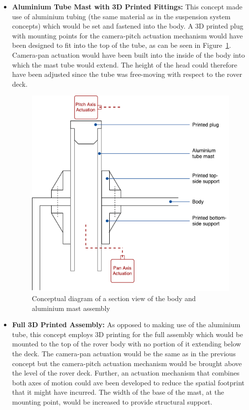       \begin{itemize}
        \item \textbf{Aluminium Tube Mast with 3D Printed Fittings:} This concept made use of aluminium tubing (the same material as in the suspension system concepts) which would be set and fastened into the body. A 3D printed plug with mounting points for the camera-pitch actuation mechanism would have been designed to fit into the top of the tube, as can be seen in Figure~\ref{fig:concepts-aluMast}. Camera-pan actuation would have been built into the inside of the body into which the mast tube would extend. The height of the head could therefore have been adjusted since the tube was free-moving with respect to the rover deck.
        
        \begin{figure}[H]
          \centering
          \includegraphics[width=0.7\linewidth]{figures/concepts-aluMast}
          \caption[Conceptual diagram of a section view of the body and aluminium mast assembly]{Conceptual diagram of a section view of the body and aluminium mast assembly}
          \label{fig:concepts-aluMast}
        \end{figure}
        
        \item \textbf{Full 3D Printed Assembly:} As opposed to making use of the aluminium tube, this concept employs 3D printing for the full assembly which would be mounted to the top of the rover body with no portion of it extending below the deck. The camera-pan actuation would be the same as in the previous concept but the camera-pitch actuation mechanism would be brought above the level of the rover deck. Further, an actuation mechanism that combines both axes of motion could ave been developed to reduce the spatial footprint that it might have incurred. The width of the base of the mast, at the mounting point, would be increased to provide structural support.
        

\end{itemize}
